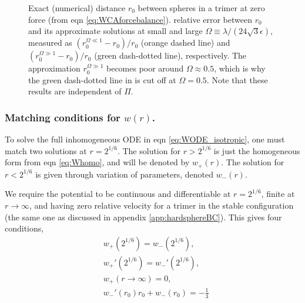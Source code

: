 \documentclass[twocolumn,amsmath,amssymb,aps]{revtex4-1}%
\begin{document}
\begin{figure}[!t]
  \subfloat{\label{fig:2b}}
  \caption{\protect{} Exact (numerical) distance $r_0$ between
    spheres in a trimer at zero force (from eqn \ref{eq:WCAforcebalance}).
    \protect{} relative error between $r_0$ and its approximate
    solutions at small and large $\Omega\equiv\lambda/(24\sqrt{3}\epsilon)$,
    measured as $(r_0^{\Omega\ll1}-r_0)/r_0$ (orange dashed line) and
    $(r_0^{\Omega\gg1}-r_0)/r_0$ (green dash-dotted line), respectively.
    The approximation $r_0^{\Omega\gg1}$ becomes poor around
    $\Omega\approx0.5$, which is why the green dash-dotted line in
    \protect{} is cut off at $\Omega = 0.5$. Note that these
    results are independent of $\Pi$.}\label{fig:2}
\end{figure}
  
\subsubsection{Matching conditions for $w(r)$.}
To solve the full inhomogeneous ODE in eqn \ref{eq:WODE_isotropic}, one must
match two solutions at $r=2^{1/6}$.
The solution for $r>2^{1/6}$ is just the homogeneous
form from eqn \ref{eq:Whomo}, and will be denoted by $w_{+}(r)$. The solution
for $r<2^{1/6}$ is given through variation of parameters, denoted $w_{-}(r)$.

We require the potential to be continuous and differentiable at $r=2^{1/6}$,
finite at $r\to\infty$, and having zero relative velocity for a trimer in
the stable configuration (the same one as discussed in appendix
\ref{app:hardsphereBC}). This gives four conditions,
\begin{subequations}
  \label{eqs:genericmatchingconditions}
  \begin{align}
    &w_{+}(2^{1/6})=w_{-}(2^{1/6}),\label{eq:match1}\\
    &w_{+}'(2^{1/6}) = w_{-}'(2^{1/6}),\label{eq:match2}\\
    &w_{+}(r\to\infty)=0,\label{eq:match3}\\
    &w_{-}'(r_0)r_0+w_{-}(r_0)=-\frac{1}{3}\label{eq:match4}
  \end{align}
\end{subequations}
\end{document}
